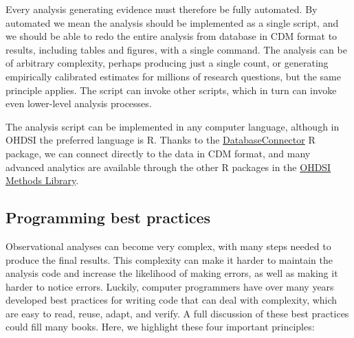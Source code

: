\documentclass[11pt]{book}
\theoremstyle{definition}
\theoremstyle{definition}
\theoremstyle{definition}
\theoremstyle{remark}
\begin{document}
Every analysis generating evidence must therefore be fully automated. By automated we mean the analysis should be implemented as a single script, and we should be able to redo the entire analysis from database in CDM format to results, including tables and figures, with a single command. The analysis can be of arbitrary complexity, perhaps producing just a single count, or generating empirically calibrated estimates for millions of research questions, but the same principle applies. The script can invoke other scripts, which in turn can invoke even lower-level analysis processes.

The analysis script can be implemented in any computer language, although in OHDSI the preferred language is R. Thanks to the \href{https://ohdsi.github.io/DatabaseConnector/}{DatabaseConnector} R package, we can connect directly to the data in CDM format, and many advanced analytics are available through the other R packages in the \href{https://ohdsi.github.io/MethodsLibrary/}{OHDSI Methods Library}.

\hypertarget{programming-best-practices}{%
\subsection{Programming best practices}\label{programming-best-practices}}

Observational analyses can become very complex, with many steps needed to produce the final results. This complexity can make it harder to maintain the analysis code and increase the likelihood of making errors, as well as making it harder to notice errors. Luckily, computer programmers have over many years developed best practices for writing code that can deal with complexity, which are easy to read, reuse, adapt, and verify. \citep{Martin_2008} A full discussion of these best practices could fill many books. Here, we highlight these four important principles: 
\end{document}
